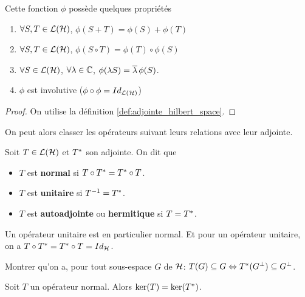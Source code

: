 Cette fonction $\phi$ possède quelques propriétés

\begin{proposition}
\begin{enumerate}
	\item $\forall S, T \in \mathcal{L}(\mathcal{H})$, $\phi(S + T) =
		\phi(S) + \phi(T)$
	\item $\forall S, T \in \mathcal{L}(\mathcal{H})$, $\phi(S \circ T) = \phi(T)
		\circ \phi(S)$
	\item $\forall S \in \mathcal{L}(\mathcal{H})$, $\forall \lambda \in
		\mathbb{C}$, $\phi(\lambda S) = \overline{\lambda} \, \phi(S)$.
	\item $\phi$ est involutive ($\phi \circ \phi =
		Id_{\mathcal{L}(\mathcal{H})}$)
\end{enumerate}
\end{proposition}

\begin{proof}
	On utilise la définition \ref{def:adjointe_hilbert_space}.
\end{proof}

On peut alors classer les opérateurs suivant leurs relations avec leur adjointe.

\begin{definition}
	Soit $T \in \mathcal{L}(\mathcal{H})$ et $T^{*}$ son adjointe. On
	dit que
	\begin{itemize}
		\item $T$ est \textbf{normal} si $T \circ T^{*} = T^{*}
			\circ T$.
		\item $T$ est \textbf{unitaire} si $T^{-1} = T^{*}$.
		\item $T$ est \textbf{autoadjointe} ou \textbf{hermitique} si $T =
			T^{*}$.
	\end{itemize}
\end{definition}

\begin{remarque}
	Un opérateur unitaire est en particulier normal. Et pour un opérateur
	unitaire, on a $T \circ T^{*} = T^{*} \circ T =
	Id_{\mathcal{H}}$.
\end{remarque}

\begin{exercice}
	Montrer qu'on a, pour tout sous-espace $G$ de $\mathcal{H}$:
	$T(G) \subseteq G \Leftrightarrow T^{*}(G^{\perp}) \subseteq G^{\perp}$.
\end{exercice}

\begin{exercice}
	Soit $T$ un opérateur normal. Alors $\ker(T) = \ker(T^{*})$.
\end{exercice}


